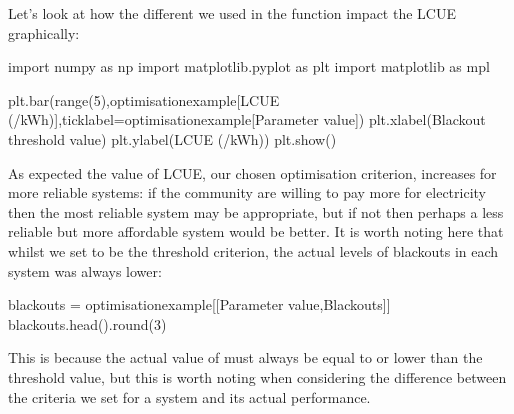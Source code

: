 \documentclass[letterpaper,10pt,english]{sphinxmanual}
\begin{document}
\sphinxAtStartPar
Let’s look at how the different  we used in the
function impact the LCUE graphically:

\begin{sphinxVerbatim}[commandchars=\\\{\}]
import numpy as np
import matplotlib.pyplot as plt
import matplotlib as mpl

plt.bar(range(5),optimisation\PYGZus{}example[\PYGZsq{}LCUE (\PYGZdl{}/kWh)\PYGZsq{}],tick\PYGZus{}label=optimisation\PYGZus{}example[\PYGZsq{}Parameter value\PYGZsq{}])
plt.xlabel(\PYGZsq{}Blackout threshold value\PYGZsq{})
plt.ylabel(\PYGZsq{}LCUE (\PYGZdl{}/kWh)\PYGZsq{})
plt.show()
\end{sphinxVerbatim}

\noindent{}

\sphinxAtStartPar
As expected the value of LCUE, our chosen optimisation criterion,
increases for more reliable systems: if the community are willing to pay
more for electricity then the most reliable system may be appropriate,
but if not then perhaps a less reliable but more affordable system would
be better. It is worth noting here that whilst we set  to
be the threshold criterion, the actual levels of blackouts in each
system was always lower:

\begin{sphinxVerbatim}[commandchars=\\\{\}]
blackouts = optimisation\PYGZus{}example[[\PYGZsq{}Parameter value\PYGZsq{},\PYGZsq{}Blackouts\PYGZsq{}]]
blackouts.head().round(3)
\end{sphinxVerbatim}



\begin{DUlineblock}{0em}
\item[] 
\end{DUlineblock}

\sphinxAtStartPar
This is because the actual value of  must always be equal
to or lower than the threshold value, but this is worth noting when
considering the difference between the criteria we set for a system and
its actual performance.
\end{document}
